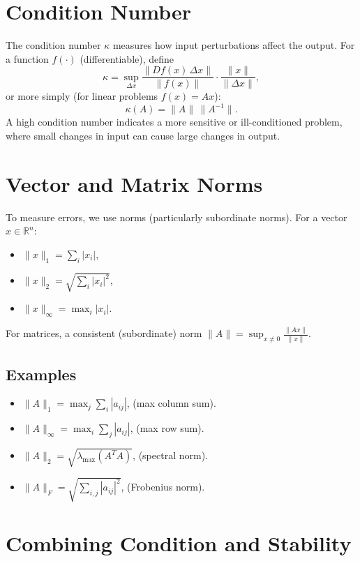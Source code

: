 \documentclass[12pt]{article}
\begin{document}
\section*{Condition Number}

\noindent
The condition number $\kappa$ measures how input perturbations affect the output. For a function $f(\cdot)$ (differentiable), define
\[
\kappa = \sup_{\Delta x} \frac{\|Df(x)\,\Delta x\|}{\|f(x)\|} \cdot \frac{\|x\|}{\|\Delta x\|},
\]
or more simply (for linear problems $f(x)=Ax$):
\[
\kappa(A) = \|A\|\,\|A^{-1}\|.
\]
A high condition number indicates a more sensitive or ill-conditioned problem, where small changes in input can cause large changes in output.

\section*{Vector and Matrix Norms}

To measure errors, we use norms (particularly subordinate norms). For a vector $x\in \mathbb{R}^n$:

\begin{itemize}
    \item $\|x\|_1 = \sum_i |x_i|$,
    \item $\|x\|_2 = \sqrt{\sum_i |x_i|^2}$,
    \item $\|x\|_\infty = \max_i |x_i|$.
\end{itemize}

For matrices, a consistent (subordinate) norm $\|A\| = \sup_{x\neq 0} \frac{\|Ax\|}{\|x\|}.$

\subsection*{Examples}
\begin{itemize}
    \item $\|A\|_1 = \max_{j} \sum_i |a_{ij}|$, (max column sum).
    \item $\|A\|_\infty = \max_{i} \sum_j |a_{ij}|$, (max row sum).
    \item $\|A\|_2 = \sqrt{\lambda_{\max}(A^TA)}$, (spectral norm).
    \item $\|A\|_F = \sqrt{\sum_{i,j} |a_{ij}|^2}$, (Frobenius norm).
\end{itemize}

\section*{Combining Condition and Stability}
\end{document}
